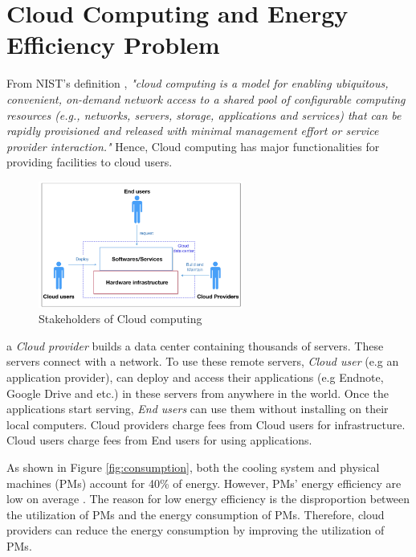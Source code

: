 \section{Cloud Computing and Energy Efficiency Problem}
\label{sec:background}


 From NIST's definition \cite{Mell:2011jj}, \textit{"cloud computing is a model for enabling ubiquitous, convenient, on-demand network access to a shared pool of configurable computing resources (e.g., networks, servers, storage, applications and services) that can be rapidly provisioned and released with minimal management effort or service provider interaction."} Hence, Cloud computing has major functionalities for providing facilities to cloud users.

\begin{figure}
	\centering
	\includegraphics[width=0.6\textwidth]{pics/stakeholders.png}
	\caption{Stakeholders of Cloud computing \cite{Jennings:2015ht}}
	\label{fig:stakeholders}
\end{figure}

 a \emph{Cloud provider} builds a data center containing thousands of servers. These servers connect with a network. 
To use these remote servers, \emph{Cloud user} (e.g an application provider), can deploy and access their applications (e.g Endnote, Google Drive and etc.) in these servers from anywhere in the world. Once the applications start serving, \emph{End users} can use them without installing on their local computers. Cloud providers charge fees from Cloud users for infrastructure. Cloud users charge fees from End users for using applications. 

 As shown in Figure \ref{fig:consumption}, both the cooling system and physical machines (PMs) account for 40\% of energy. However, PMs' energy efficiency are low on average  \cite{Hameed:2016cmb}.
The reason for low energy efficiency is the disproportion between the utilization of PMs and the energy consumption of PMs.  Therefore, 
cloud providers can reduce the energy consumption by improving the utilization of PMs.


